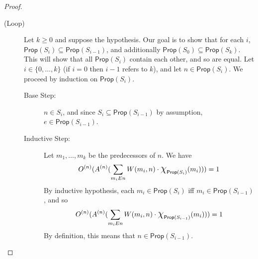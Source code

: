\documentclass[letterpaper]{article}
\theoremstyle{definition}
\newcommand{\set}[1]{\{ #1 \}}
\newcommand*{\bigchi}{\mbox{\Large$\chi$}}%
\newcommand{\Prop}{\textsf{Prop}}
\begin{document}
\begin{proof}
\begin{description}
    
    \item[(Loop)] Let $k \geq 0$ and suppose the hypothesis.  Our goal is to show that for each $i$, $\Prop(S_i) \subseteq \Prop(S_{i-1})$, and additionally $\Prop(S_0) \subseteq \Prop(S_k)$.  This will show that all $\Prop(S_i)$ contain each other, and so are equal.  Let $i \in \set{0, \ldots, k}$ (if $i = 0$ then $i-1$ refers to $k$), and let $n \in \Prop(S_i)$.  We proceed by induction on $\Prop(S_i)$.
    
    \begin{description}
    \item[Base Step:] $n \in S_i$, and since $S_i \subseteq \Prop(S_{i-1})$ by assumption, $e \in \Prop(S_{i-1})$.
    
    \item[Inductive Step:] Let $m_1, \ldots, m_k$ be the predecessors of $n$. We have
    \[
    O^{(n)}(A^{(n)}(\sum_{m_i{E}n} W(m_i, n) \cdot \bigchi_{\Prop(S_i)}(m_i))) = 1
    \]
    By inductive hypothesis, each $m_i \in \Prop(S_i)$ iff $m_i \in \Prop(S_{i-1})$, and so
    \[
    O^{(n)}(A^{(n)}(\sum_{m_i{E}n} W(m_i, n) \cdot \bigchi_{\Prop(S_{i-1})}(m_i))) = 1
    \]
    By definition, this means that $n \in \Prop(S_{i-1})$. \qedhere
    \end{description}
\end{description}
\end{proof}
\end{document}
